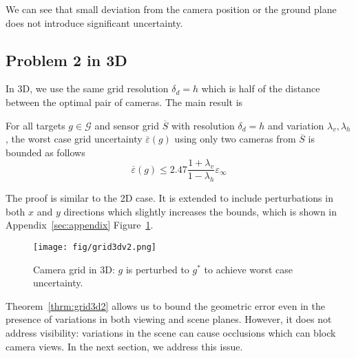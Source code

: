 We can see that small deviation from the camera position or the ground plane does not introduce significant uncertainty. 

\subsection{Problem 2 in 3D}

In 3D, we use the same grid resolution $\delta_d = h$ which is half of the distance between the optimal pair of cameras. The main result is
\begin{theorem}\label{thrm:grid3d2}
For all targets $g \in \mathcal{G}$ and sensor grid $\overline{S}$ with resolution $\delta_d = h$ and variation $\lambda_v,\lambda_h$, the worst case grid uncertainty $\overline{\varepsilon}(g)$ using only two cameras from $\overline{S}$ is bounded as follows
$$
\overline{\varepsilon}(g) \leqslant 2.47\frac{1+\lambda_v}{1-\lambda_h} \varepsilon_\infty
$$
\end{theorem}

The proof is similar to the 2D case. It is extended to include perturbations in both $x$ and $y$ directions which slightly increases the bounds, which is shown in Appendix~\ref{sec:appendix} Figure~\ref{fig:grid3dv2}.


\begin{figure}[h]
\centering
	\texttt{[image: fig/grid3dv2.png]}
	\caption{Camera grid in 3D: $g$ is perturbed to $g^*$ to achieve worst case uncertainty.}
	\label{fig:grid3dv2}
\end{figure} 

Theorem~\ref{thrm:grid3d2} allows us to bound the geometric error even in the presence of variations in both viewing and scene planes. However, it does not address visibility: variations in the scene can cause occlusions which can block camera views. In the next section, we address this issue. 